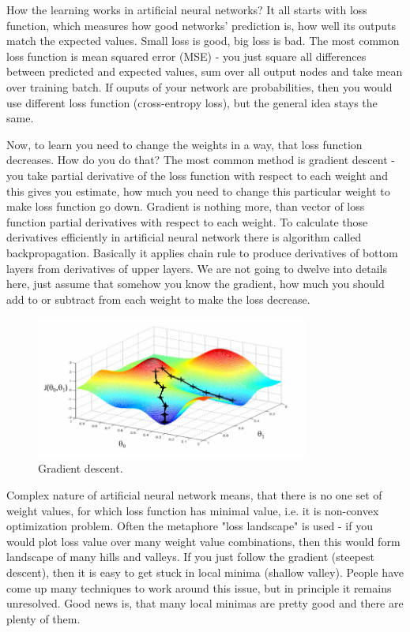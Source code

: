 \documentclass[a4paper,11pt]{article}
\begin{document}
How the learning works in artificial neural networks? It all starts with loss function, which measures how good networks' prediction is, how well its outputs match the expected values. Small loss is good, big loss is bad. The most common loss function is mean squared error (MSE) - you just square all differences between predicted and expected values, sum over all output nodes and take mean over training batch. If ouputs of your network are probabilities, then you would use different loss function (cross-entropy loss), but the general idea stays the same.

Now, to learn you need to change the weights in a way, that loss function decreases. How do you do that? The most common method is gradient descent - you take partial derivative of the loss function with respect to each weight and this gives you estimate, how much you need to change this particular weight to make loss function go down. Gradient is nothing more, than vector of loss function partial derivatives with respect to each weight. To calculate those derivatives efficiently in artificial neural network there is algorithm called backpropagation. Basically it applies chain rule to produce derivatives of bottom layers from derivatives of upper layers. We are not going to dwelve into details here, just assume that somehow you know the gradient, how much you should add to or subtract from each weight to make the loss decrease.

\begin{figure}[h]
	\centering
	\includegraphics[width=0.8\textwidth]{gradient_descent.png}
	\caption{Gradient descent.}
%
%
\end{figure}

Complex nature of artificial neural network means, that there is no one set of weight values, for which loss function has minimal value, i.e. it is non-convex optimization problem. Often the metaphore "loss landscape" is used - if you would plot loss value over many weight value combinations, then this would form landscape of many hills and valleys. If you just follow the gradient (steepest descent), then it is easy to get stuck in local minima (shallow valley). People have come up many techniques to work around this issue, but in principle it remains unresolved. Good news is, that many local minimas are pretty good and there are plenty of them.
\end{document}
